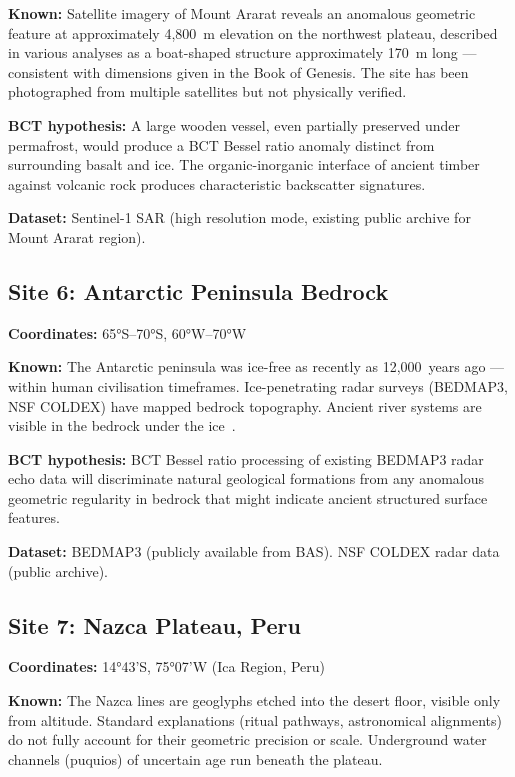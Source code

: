 \documentclass[12pt,twocolumn]{article}
\begin{document}
\textbf{Known:} Satellite imagery of Mount Ararat reveals
an anomalous geometric feature at approximately 4,800~m
elevation on the northwest plateau, described in various
analyses as a boat-shaped structure approximately 170~m
long --- consistent with dimensions given in the Book of
Genesis. The site has been photographed from multiple
satellites but not physically verified.

\textbf{BCT hypothesis:} A large wooden vessel, even
partially preserved under permafrost, would produce a
BCT Bessel ratio anomaly distinct from surrounding
basalt and ice. The organic-inorganic interface of
ancient timber against volcanic rock produces
characteristic backscatter signatures.

\textbf{Dataset:} Sentinel-1 SAR (high resolution mode,
existing public archive for Mount Ararat region).

\subsection{Site 6: Antarctic Peninsula Bedrock}

\textbf{Coordinates:} 65°S--70°S, 60°W--70°W

\textbf{Known:} The Antarctic peninsula was ice-free as
recently as 12,000~years ago --- within human civilisation
timeframes. Ice-penetrating radar surveys (BEDMAP3, NSF
COLDEX) have mapped bedrock topography. Ancient river
systems are visible in the bedrock under the ice~\cite{Young2026}.

\textbf{BCT hypothesis:} BCT Bessel ratio processing of
existing BEDMAP3 radar echo data will discriminate natural
geological formations from any anomalous geometric regularity
in bedrock that might indicate ancient structured surface
features.

\textbf{Dataset:} BEDMAP3 (publicly available from BAS).
NSF COLDEX radar data (public archive).

\subsection{Site 7: Nazca Plateau, Peru}

\textbf{Coordinates:} 14°43'S, 75°07'W (Ica Region, Peru)

\textbf{Known:} The Nazca lines are geoglyphs etched into
the desert floor, visible only from altitude. Standard
explanations (ritual pathways, astronomical alignments) do
not fully account for their geometric precision or scale.
Underground water channels (puquios) of uncertain age
run beneath the plateau.
\end{document}
